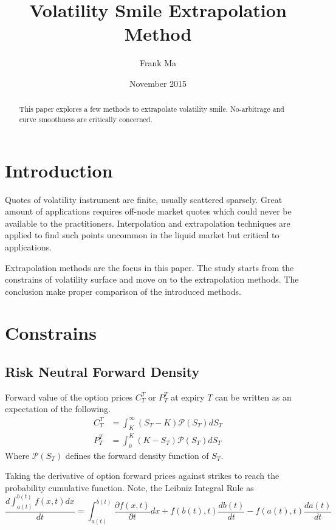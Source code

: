 \documentclass{article}
\title{Volatility Smile Extrapolation Method}
\author{Frank Ma}
\date{November 2015}
\begin{document}
\maketitle

\begin{abstract}
    This paper explores a few methods to extrapolate volatility smile.
    No-arbitrage and curve smoothness are critically concerned.
\end{abstract}


\section{Introduction}

Quotes of volatility instrument are finite, usually scattered sparsely.
Great amount of applications requires off-node market quotes which could never be available to the practitioners.
Interpolation and extrapolation techniques are applied to find such points uncommon in the liquid market but critical to applications.

Extrapolation methods are the focus in this paper.
The study starts from the constrains of volatility surface and move on to the extrapolation methods.
The conclusion make proper comparison of the introduced methods.


\section{Constrains}

\subsection{Risk Neutral Forward Density}
Forward value of the option prices $ C_T^T $ or $ P_T^T $ at expiry $ T $ can be written as an expectation of the following.
\begin{subequations}
    \begin{align}
        C_T^T &= \int_{K}^{\infty}{(S_T - K) \mathcal{P}\left(S_T\right)} d S_T \\
        P_T^T &= \int_{0}^{K}{(K - S_T) \mathcal{P}\left(S_T\right)} d S_T
    \end{align}
\end{subequations}
Where $ \mathcal{P}(S_T) $ defines the forward density function of $ S_T $.

Taking the derivative of option forward prices against strikes to reach the probability cumulative function.
Note, the Leibniz Integral Rule as
\begin{equation}
    \frac{d \int_{a(t)}^{b(t)}{f(x, t)} d x}{d t} = \int_{a(t)}^{b(t)}{\frac{\partial f(x, t)}{\partial t} d x} + f\left(b(t), t\right) \frac{d b(t)}{d t} - f\left(a(t), t\right) \frac{d a(t)}{d t}
\end{equation}
\end{document}
